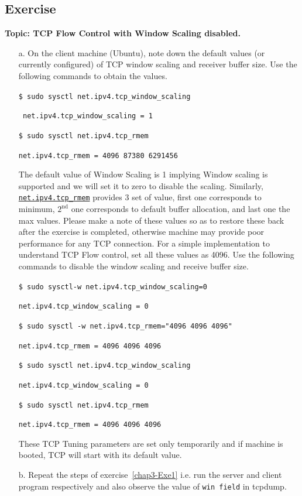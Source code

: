 \begin{multicols}{2}
\section{Exercise}\label{chap3-Exe2}

\textbf{Topic: TCP Flow Control with Window Scaling disabled.}
\begin{itemize}
\item[a.] On the client machine (Ubuntu), note down the default values (or currently configured) of TCP window scaling and receiver buffer size. Use the following commands to obtain the values.

\texttt{\$ sudo sysctl net.ipv4.tcp\_window\_scaling}

\texttt{ net.ipv4.tcp\_window\_scaling = 1 }
 
 \texttt{\$ sudo sysctl  net.ipv4.tcp\_rmem }
 
 \texttt{net.ipv4.tcp\_rmem = 4096	87380	6291456}
 
 The default value of Window Scaling is 1 implying Window scaling is supported and we will set it to zero to disable the scaling. Similarly, \texttt{\url{net.ipv4.tcp\_rmem}}  provides 3 set of value, first one corresponds to minimum, $2^{\text{nd}}$ one corresponds to default buffer allocation, and last one the max values. Please make a note of these values so as to restore these back after the exercise is completed, otherwise machine may provide poor performance for any TCP connection. For a simple implementation to understand TCP Flow control, set all these values as 4096. Use the following commands to disable the window scaling and receive buffer size. 
 
 \texttt{\$ sudo sysctl-w net.ipv4.tcp\_window\_scaling=0}
 
\texttt{net.ipv4.tcp\_window\_scaling = 0}

\texttt{\$ sudo sysctl -w net.ipv4.tcp\_rmem="4096 4096 4096"}

\texttt{net.ipv4.tcp\_rmem = 4096 4096 4096}

\texttt{\$ sudo sysctl net.ipv4.tcp\_window\_scaling}

\texttt{net.ipv4.tcp\_window\_scaling = 0}

\texttt{\$ sudo sysctl  net.ipv4.tcp\_rmem}

\texttt{net.ipv4.tcp\_rmem = 4096	4096	4096}

These TCP Tuning parameters are set only temporarily and if machine is booted, TCP will start with its default value.

 \item[b.] Repeat the steps of exercise~\ref{chap3-Exe1} i.e. run the server and client program respectively and also observe the value of \texttt{win field} in tcpdump.


\end{itemize}
\end{multicols}
